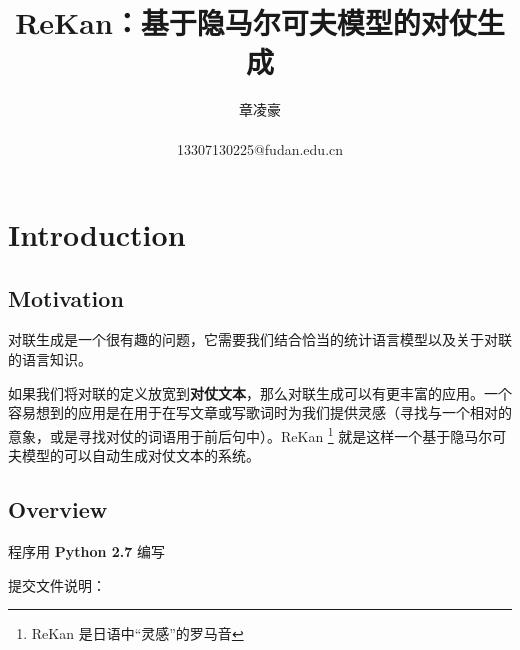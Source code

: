 \documentclass[12pt]{article}
\title{\Huge ReKan：基于隐马尔可夫模型的对仗生成}
\author{{\Large 章凌豪}\\ \\13307130225@fudan.edu.cn}
\date{}
\begin{document}

\null  %
\nointerlineskip  %
\vfill
\let\snewpage \newpage
\let\newpage \relax
\maketitle
\let \newpage \snewpage
\vfill 
\break %

\newpage


\pagestyle{fancy}
\rhead{\textbf{\nouppercase{\firstleftmark}}}
\cfoot{\thepage}

\section{Introduction}

\subsection{Motivation}

对联生成是一个很有趣的问题，它需要我们结合恰当的统计语言模型以及关于对联的语言知识。

如果我们将对联的定义放宽到\textbf{对仗文本}，那么对联生成可以有更丰富的应用。一个容易想到的应用是在用于在写文章或写歌词时为我们提供灵感（寻找与一个相对的意象，或是寻找对仗的词语用于前后句中）。ReKan \footnote{ReKan 是日语中“灵感”的罗马音} 就是这样一个基于隐马尔可夫模型的可以自动生成对仗文本的系统。

\subsection{Overview}

程序用 \textbf{Python 2.7} 编写

提交文件说明：
\end{document}

